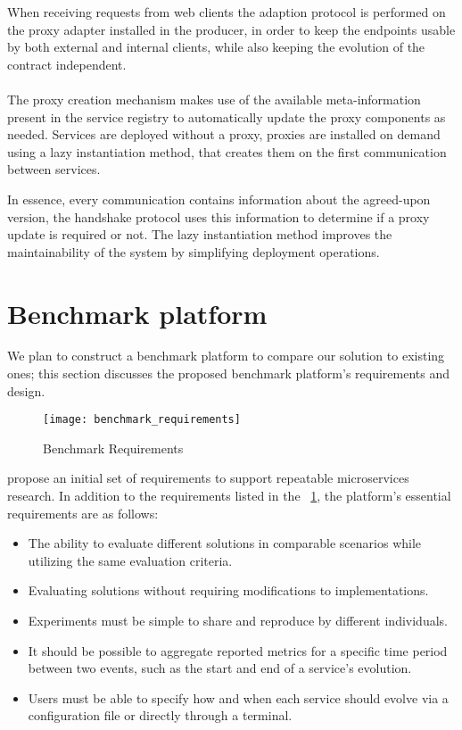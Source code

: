 When receiving requests from web clients the adaption protocol is performed on the proxy adapter installed in the producer,
in order to keep the endpoints usable by both external and internal clients, while also keeping the evolution of the contract independent.

\paragraph{}

The proxy creation mechanism makes use of the available meta-information present in the service registry
to automatically update the proxy components as needed.
Services are deployed without a proxy, proxies are installed on demand using a lazy instantiation method,
that creates them on the first communication between services.

In essence, every communication contains information about the agreed-upon version, the handshake protocol uses this information to determine if a proxy update is required or not.
The lazy instantiation method improves the maintainability of the system by
simplifying deployment operations.

\section{Benchmark platform} %
\label{sec:benchmark_platform}

We plan to construct a benchmark platform to compare our solution to existing ones; this section discusses the proposed benchmark platform's requirements and design.

\begin{figure}[htbp]
    \centering
    \texttt{[image: benchmark\_requirements]}
    \caption{Benchmark Requirements \cite{microservices2017benchmark}}
    \label{fig:benchmark}
\end{figure}

\citeauthor{microservices2017benchmark} propose an initial set of requirements
to support repeatable microservices research.
In addition to the requirements listed in the ~\ref{fig:benchmark}, the platform's essential requirements are as follows:
\begin{itemize}
    \item The ability to evaluate different solutions in comparable scenarios while utilizing the same evaluation criteria.
    \item Evaluating solutions without requiring modifications to implementations.
    \item Experiments must be simple to share and reproduce by different individuals.
    \item It should be possible to aggregate reported metrics for a specific time period between two events, such as the start and end of a service's evolution.
    \item Users must be able to specify how and when each service should evolve via a configuration file or directly through a terminal.
\end{itemize}

